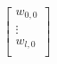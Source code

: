 \documentclass[10pt]{article}
\begin{document}
\begin{align*}\begin{bmatrix}
w_{0,0} \\
\vdots \\
w_{l,0} \\
\end{bmatrix}


\end{align*}
\end{document}
